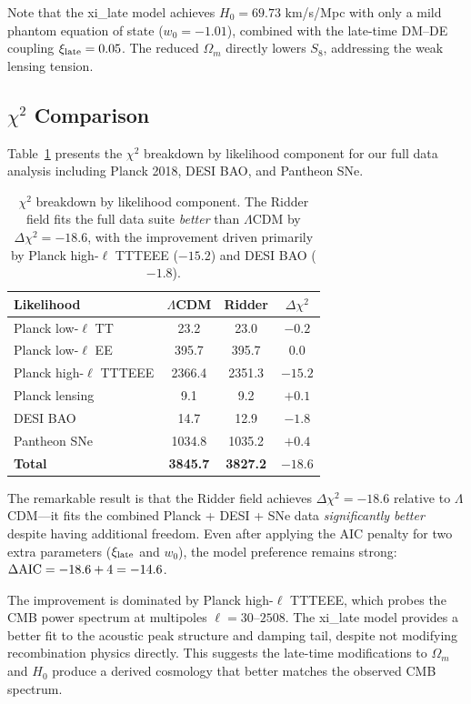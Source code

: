 \documentclass[twocolumn,showpacs,preprintnumbers,amsmath,amssymb,prd]{revtex4-2}
\begin{document}
Note that the xi\_late model achieves $H_0 = 69.73$ km/s/Mpc with only a mild phantom equation of state ($w_0 = -1.01$), combined with the late-time DM--DE coupling $\xi_{\rm late} = 0.05$. The reduced $\Omega_m$ directly lowers $S_8$, addressing the weak lensing tension.

\subsection{$\chi^2$ Comparison}

Table~\ref{tab:chi2} presents the $\chi^2$ breakdown by likelihood component for our full data analysis including Planck 2018, DESI BAO, and Pantheon SNe.

\begin{table}[h]
\centering
\begin{tabular}{lccc}
\toprule
Likelihood & $\Lambda$CDM & Ridder & $\Delta\chi^2$ \\
\midrule
Planck low-$\ell$ TT & 23.2 & 23.0 & $-0.2$ \\
Planck low-$\ell$ EE & 395.7 & 395.7 & $0.0$ \\
Planck high-$\ell$ TTTEEE & 2366.4 & 2351.3 & $\mathbf{-15.2}$ \\
Planck lensing & 9.1 & 9.2 & $+0.1$ \\
DESI BAO & 14.7 & 12.9 & $\mathbf{-1.8}$ \\
Pantheon SNe & 1034.8 & 1035.2 & $+0.4$ \\
\midrule
\textbf{Total} & \textbf{3845.7} & \textbf{3827.2} & $\mathbf{-18.6}$ \\
\bottomrule
\end{tabular}
\caption{$\chi^2$ breakdown by likelihood component. The Ridder field fits the full data suite \textit{better} than $\Lambda$CDM by $\Delta\chi^2 = -18.6$, with the improvement driven primarily by Planck high-$\ell$ TTTEEE ($-15.2$) and DESI BAO ($-1.8$).}
\label{tab:chi2}
\end{table}

The remarkable result is that the Ridder field achieves $\Delta\chi^2 = -18.6$ relative to $\Lambda$CDM---it fits the combined Planck + DESI + SNe data \textit{significantly better} despite having additional freedom. Even after applying the AIC penalty for two extra parameters ($\xi_{\rm late}$ and $w_0$), the model preference remains strong: $\Delta{\rm AIC} = -18.6 + 4 = -14.6$.

The improvement is dominated by Planck high-$\ell$ TTTEEE, which probes the CMB power spectrum at multipoles $\ell = 30$--$2508$. The xi\_late model provides a better fit to the acoustic peak structure and damping tail, despite not modifying recombination physics directly. This suggests the late-time modifications to $\Omega_m$ and $H_0$ produce a derived cosmology that better matches the observed CMB spectrum.
\end{document}
